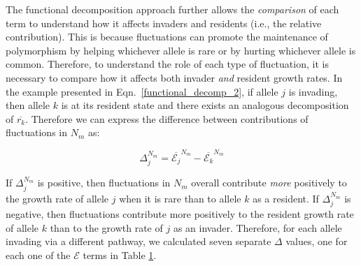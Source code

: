 \begin{refsection}
\begin{table}[h]
{\begin{tabular}{l|l|l}




         \bottomrule
    \end{tabular}}
    \label{tab:EllnerRs}
\end{table}



The functional decomposition approach further allows the \textit{comparison} of each term to understand how it affects invaders and residents (i.e., the relative contribution). This is because fluctuations can promote the maintenance of polymorphism by helping whichever allele is rare or by hurting whichever allele is common. Therefore, to understand the role of each type of fluctuation, it is necessary to compare how it affects both invader \textit{and} resident growth rates. In the example presented in Eqn.~\ref{functional_decomp_2}, if allele $j$ is invading, then allele $k$ is at its resident state and there exists an analogous decomposition of $\overline{r_{k}}$. Therefore we can express the difference between contributions of fluctuations in $N_{m}$ as:


\begin{equation}
\Delta^{N_{m}}_{j}= \overline{\mathcal{E}_{j}}^{N_{m}} - \overline{\mathcal{E}_{k}}^{N_{m}}
\label{delta}
\end{equation}

If $\Delta^{N_{m}}_{j}$ is positive, then fluctuations in $N_{m}$ overall contribute \textit{more} positively to the growth rate of allele $j$ when it is rare than to allele $k$ as a resident. If $\Delta^{N_{m}}_{j}$ is negative, then fluctuations contribute more positively to the resident growth rate of allele $k$ than to the growth rate of $j$ as an invader. Therefore, for each allele invading via a different pathway, we calculated seven separate $\Delta$ values, one for each one of the $\mathcal{E}$ terms in Table \ref{tab:EllnerRs}.



\end{refsection}
